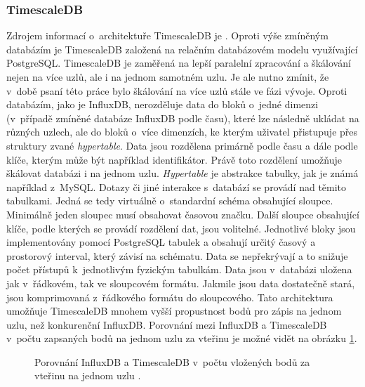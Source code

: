 \subsubsection*{TimescaleDB}
Zdrojem informací o~architektuře TimescaleDB je \cite{TimescaleDoku}. Oproti výše zmíněným databázím je TimescaleDB založená na relačním databázovém modelu využívající PostgreSQL. TimescaleDB je zaměřená na lepší paralelní zpracování a škálování nejen na více uzlů, ale i na jednom samotném uzlu. Je ale nutno zmínit, že v~době psaní této práce bylo škálování na více uzlů stále ve fázi vývoje. Oproti databázím, jako je InfluxDB, nerozděluje data do bloků o~jedné dimenzi (v~případě zmíněné databáze InfluxDB podle času), které lze následně ukládat na různých uzlech, ale do bloků o~více dimenzích, ke kterým uživatel přistupuje přes struktury zvané \textit{hypertable}. Data jsou rozdělena primárně podle času a dále podle klíče, kterým může být například identifikátor. Právě toto rozdělení umožňuje škálovat databázi i na jednom uzlu. \textit{Hypertable} je abstrakce tabulky, jak je známá například z~MySQL. Dotazy či jiné interakce s~databází se provádí nad těmito tabulkami. Jedná se tedy virtuálně o~standardní schéma obsahující sloupce. Minimálně jeden sloupec musí obsahovat časovou značku. Další sloupce obsahující klíče, podle kterých se provádí rozdělení dat, jsou volitelné. Jednotlivé bloky jsou implementovány pomocí PostgreSQL tabulek a obsahují určitý časový a prostorový interval, který závisí na schématu. Data se nepřekrývají a to snižuje počet přístupů k~jednotlivým fyzickým tabulkám. Data jsou v~databázi uložena jak v~řádkovém, tak ve sloupcovém formátu. Jakmile jsou data dostatečně stará, jsou komprimovaná z~řádkového formátu do sloupcového. Tato architektura umožňuje TimescaleDB mnohem vyšší propustnost bodů pro zápis na jednom uzlu, než konkurenční InfluxDB. Porovnání mezi InfluxDB a TimescaleDB v~počtu zapsaných bodů na jednom uzlu za vteřinu je možné vidět na obrázku \ref{pic:timescaleComparisson}.

\begin{figure}[h]
  \centering
  \caption{Porovnání InfluxDB a TimescaleDB v~počtu vložených bodů za vteřinu na jednom uzlu \cite{InfluxVsTimescale}.}\label{pic:timescaleComparisson}
\end{figure}

